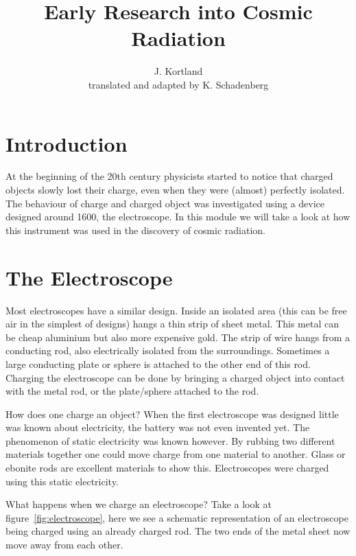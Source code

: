 


\author{J. Kortland \\ translated and adapted by K. Schadenberg}
\date{}
\title{Early Research into Cosmic Radiation}



\maketitle

\section{Introduction}
At the beginning of the 20th century physicists started to notice that charged objects slowly lost their charge, even when they were (almost) perfectly isolated. The behaviour of charge and charged object was investigated using a device designed around 1600, the electroscope. In this module we will take a look at how this instrument was used in the discovery of cosmic radiation.

\section{The Electroscope}
Most electroscopes have a similar design. Inside an isolated area (this can be free air in the simplest of designs) hangs a thin strip of sheet metal. This metal can be cheap aluminium but also more expensive gold. The strip of wire hangs from a conducting rod, also electrically isolated from the surroundings. Sometimes a large conducting plate or sphere is attached to the other end of this rod. Charging the electroscope can be done by bringing a charged object into contact with the metal rod, or the plate/sphere attached to the rod.

How does one charge an object? When the first electroscope was designed little was known about electricity, the battery was not even invented yet. The phenomenon of static electricity was known however. By rubbing two different materials together one could move charge from one material to another. Glass or ebonite rods are excellent materials to show this. Electroscopes were charged using this static electricity.

What happens when we charge an electroscope? Take a look at figure~\ref{fig:electroscope}, here we see a schematic representation of an electroscope being charged using an already charged rod. The two ends of the metal sheet now move away from each other.

